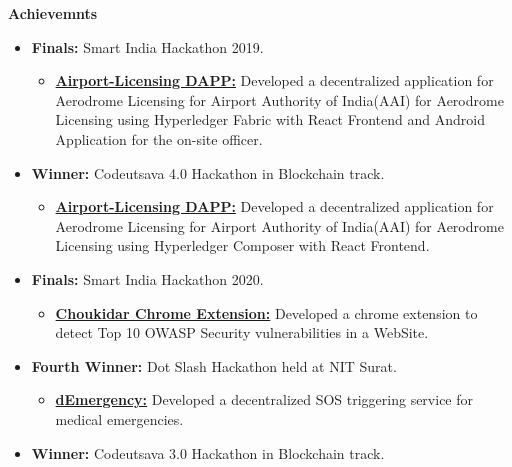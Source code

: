 \documentclass{article}
\begin{document}
\noindent \large \textbf{\textcolor{NavyBlue}{Achievemnts}}
\begin{itemize}[noitemsep,nolistsep,leftmargin=*]
    \item { \normalsize \textbf{Finals:} Smart India Hackathon 2019. 
        \begin{itemize}
            \item \normalsize \href{https://github.com/Shritesh99/airport}{\textbf{Airport-Licensing DAPP:}} Developed a decentralized application for Aerodrome Licensing for Airport Authority of India(AAI) for Aerodrome Licensing using Hyperledger Fabric with React Frontend and Android Application for the on-site officer.
        \end{itemize}
    }
    \item { \normalsize \textbf{Winner:} Codeutsava 4.0 Hackathon in Blockchain track.
        \begin{itemize}
            \item \normalsize \href{https://github.com/Shritesh99/airport}{\textbf{Airport-Licensing DAPP:}} Developed a decentralized application for Aerodrome Licensing for Airport Authority of India(AAI) for Aerodrome Licensing using Hyperledger Composer with React Frontend.
        \end{itemize}
    }
    \item { \normalsize \textbf{Finals:} Smart India Hackathon 2020. 
        \begin{itemize}
            \item \normalsize \href{https://github.com/siddharthshah3030/choukidar-owasp-security-chrome-extension}{\textbf{Choukidar Chrome Extension:}} Developed a chrome extension to detect Top 10 OWASP Security vulnerabilities in a WebSite.
        \end{itemize}
    }
    \item { \normalsize \textbf{Fourth Winner:} Dot Slash Hackathon held at NIT Surat. 
        \begin{itemize}
            \item \normalsize \href{https://bit.ly/31wXfMr}{\textbf{dEmergency:}} Developed a decentralized SOS triggering service for medical emergencies.
        \end{itemize}
    }
    \item { \normalsize \textbf{Winner:} Codeutsava 3.0 Hackathon in Blockchain track.
}
\end{itemize}
\end{document}
